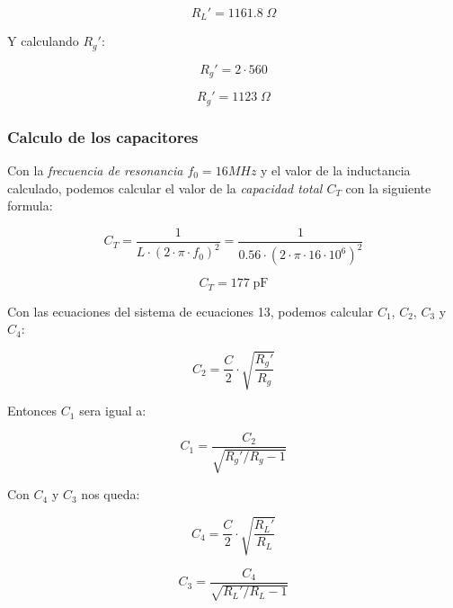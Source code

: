 \begin{equation}
    \boxed{R_L' = 1161.8\; \Omega}
\end{equation}

Y calculando $R_g'$:

\begin{equation}
    R_g' = 2 \cdot 560
\end{equation}

\begin{equation}
    \boxed{R_g' = 1123\; \Omega}
\end{equation}

\subsubsection{Calculo de los capacitores}

Con la \textit{frecuencia de resonancia $f_0 = 16 MHz$} y el valor de la inductancia calculado, podemos calcular el valor de la \textit{capacidad total $C_T$} con la siguiente formula:

\begin{equation}
    C_T = \frac{1}{L \cdot (2 \cdot \pi \cdot f_0)^2} = \frac{1}{0.56 \cdot (2 \cdot \pi \cdot 16 \cdot 10^6)^2} 
\end{equation}

\begin{equation}
    \boxed{C_T = 177\; \text{pF}}
\end{equation}

Con las ecuaciones del sistema de ecuaciones 13, podemos calcular $C_1$, $C_2$, $C_3$ y $C_4$:

\begin{equation}
    C_2 = \frac{C}{2} \cdot \sqrt{\frac{R_g'}{R_g}}
\end{equation}

Entonces $C_1$ sera igual a: 

\begin{equation}
    C_1 = \frac{C_2}{\sqrt{R_g' / R_g - 1}}
\end{equation}

Con $C_4$ y $C_3$ nos queda:

\begin{equation}
    C_4 = \frac{C}{2} \cdot \sqrt{\frac{R_L'}{R_L}}
\end{equation}

\begin{equation}
    C_3 = \frac{C_4}{\sqrt{R_L' / R_L - 1}}
\end{equation}

